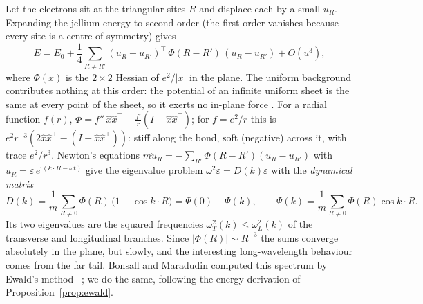 Let the electrons sit at the triangular sites $R$ and displace each by a small $u_R$. Expanding the jellium energy to
second order (the first order vanishes because every site is a centre of symmetry) gives
\[
E=E_0+\frac14\sum_{R\ne R'}(u_R-u_{R'})^{\!\top}\,\Phi(R-R')\,(u_R-u_{R'})+O(u^3),
\]
where $\Phi(x)$ is the $2\times2$ Hessian of $e^2/|x|$ in the plane. The uniform background contributes nothing at this
order: the potential of an infinite uniform sheet is the same at every point of the sheet, so it exerts no in-plane
force \tierC. For a radial function $f(r)$, $\Phi=f''\,\hat x\hat x^{\top}+\frac{f'}{r}(I-\hat x\hat x^\top)$; for $f=e^2/r$
this is $e^2r^{-3}(2\hat x\hat x^\top-(I-\hat x\hat x^\top))$: stiff along the bond, soft (negative) across it, with
trace $e^2/r^3$. Newton's equations $m\ddot u_R=-\sum_{R'}\Phi(R-R')(u_R-u_{R'})$ with $u_R=\varepsilon\,e^{\mathrm
i(k\cdot R-\omega t)}$ give the eigenvalue problem $\omega^2\varepsilon=D(k)\varepsilon$ with the \emph{dynamical
matrix}
\begin{equation}\label{qm:eq-D}
D(k)=\frac1m\sum_{R\ne0}\Phi(R)\,\bigl(1-\cos k\cdot R\bigr)=\Psi(0)-\Psi(k),\qquad
\Psi(k)=\frac1m\sum_{R\ne0}\Phi(R)\cos k\cdot R .
\end{equation}
Its two eigenvalues are the squared frequencies $\omega_T^2(k)\le\omega_L^2(k)$ of the transverse and longitudinal
branches. Since $|\Phi(R)|\sim R^{-3}$ the sums converge absolutely in the plane, but slowly, and the interesting
long-wavelength behaviour comes from the far tail. Bonsall and Maradudin computed this spectrum by Ewald's
method~\cite{bm} \tierL; we do the same, following the energy derivation of Proposition~\ref{prop:ewald}.

